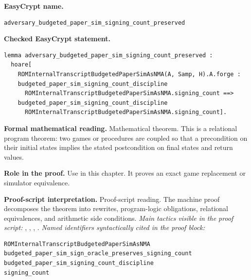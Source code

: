 \begin{formaltheorem}
\noindent\textbf{EasyCrypt name.}
\begin{lstlisting}[language=EasyCrypt,basicstyle=\ttfamily\scriptsize]
adversary_budgeted_paper_sim_signing_count_preserved
\end{lstlisting}
\noindent\textbf{Checked EasyCrypt statement.}
\begin{lstlisting}[language=EasyCrypt,basicstyle=\ttfamily\scriptsize]
lemma adversary_budgeted_paper_sim_signing_count_preserved :
  hoare[
    ROMInternalTranscriptBudgetedPaperSimAsNMA(A, Samp, H).A.forge :
    budgeted_paper_sim_signing_count_discipline
      ROMInternalTranscriptBudgetedPaperSimAsNMA.signing_count ==>
    budgeted_paper_sim_signing_count_discipline
      ROMInternalTranscriptBudgetedPaperSimAsNMA.signing_count].
\end{lstlisting}
\noindent\textbf{Formal mathematical reading.}
Mathematical theorem. This is a relational program theorem: two games or procedures are coupled so that a precondition on their initial states implies the stated postcondition on final states and return values.

\noindent\textbf{Role in the proof.}
Use in this chapter. It proves an exact game replacement or simulator equivalence.

\noindent\textbf{Proof-script interpretation.}
Proof-script reading. The machine proof decomposes the theorem into rewrites, program-logic obligations, relational equivalences, and arithmetic side conditions.
\emph{Main tactics visible in the proof script:} , , , .
\emph{Named identifiers syntactically cited in the proof block:}
\begin{lstlisting}[language=EasyCrypt,basicstyle=\ttfamily\scriptsize]
ROMInternalTranscriptBudgetedPaperSimAsNMA
budgeted_paper_sim_sign_oracle_preserves_signing_count
budgeted_paper_sim_signing_count_discipline
signing_count
\end{lstlisting}

\end{formaltheorem}

